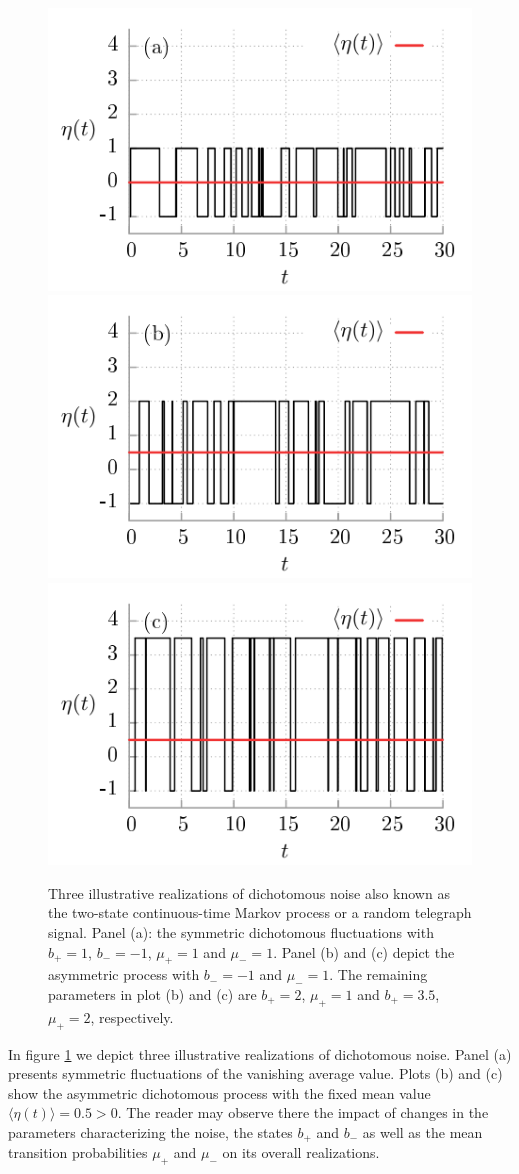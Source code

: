 \documentclass[12pt]{iopart}
\begin{document}
\begin{figure}[t]
	\centering
	\includegraphics[width=0.45\linewidth]{fig1a} \\
	\includegraphics[width=0.45\linewidth]{fig1b}
	\includegraphics[width=0.45\linewidth]{fig1c}
	\caption{Three illustrative realizations of  dichotomous noise also known as the two-state continuous-time Markov process or a random telegraph signal. Panel (a): the symmetric dichotomous fluctuations with $b_+ = 1$, $b_- = -1$, $\mu_+ = 1$ and $\mu_- = 1$. Panel (b) and (c) depict the asymmetric process with $b_- = -1$ and $\mu_- = 1$. The remaining parameters in plot (b) and (c) are $b_+ = 2$, $\mu_+ = 1$ and $b_+ = 3.5$, $\mu_+ = 2$, respectively.}
	\label{fig1}
\end{figure} 

In figure \ref{fig1} we depict three illustrative realizations of dichotomous noise. Panel (a) presents symmetric fluctuations of the vanishing average value. Plots (b) and (c) show the asymmetric dichotomous process with the fixed mean value $\langle \eta(t) \rangle = 0.5 > 0$. The reader may observe there the impact of changes in the parameters characterizing the noise, the states $b_+$ and $b_-$ as well as the mean transition probabilities $\mu_+$ and $\mu_-$ on its overall realizations. %
\end{document}
